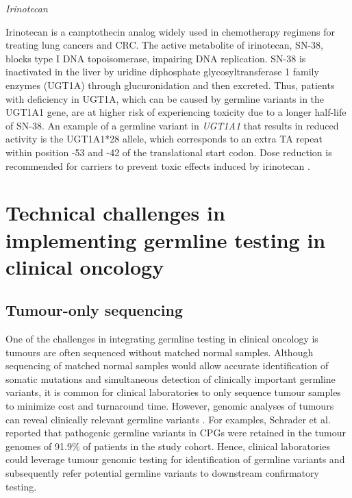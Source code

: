 \newpage
\vspace{5mm}
\noindent\textit{Irinotecan}

Irinotecan is a camptothecin analog widely used in chemotherapy regimens for treating lung cancers and CRC. The active metabolite of irinotecan, SN-38, blocks type I DNA topoisomerase, impairing DNA replication. SN-38 is inactivated in the liver by uridine diphosphate glycosyltransferase 1 family enzymes (\acs{UGT1A}) through glucuronidation and then excreted. Thus, patients with deficiency in UGT1A, which can be caused by germline variants in the \acs{UGT1A1} gene, are at higher risk of experiencing toxicity due to a longer half-life of SN-38. An example of a germline variant in \textit{UGT1A1} that results in reduced activity is the UGT1A1*28 allele, which corresponds to an extra TA repeat within position -53 and -42 of the translational start codon. Dose reduction is recommended for carriers to prevent toxic effects induced by irinotecan \cite{Panczyk2014, Mohelnikova-Duchonova2014}.

\section{Technical challenges in implementing germline testing in clinical oncology}
\label{sec:Challengesinclinicalgermlinetesting}

\subsection{Tumour-only sequencing}

One of the challenges in integrating germline testing in clinical oncology is tumours are often sequenced without matched normal samples. Although sequencing of matched normal samples would allow accurate identification of somatic mutations and simultaneous detection of clinically important germline variants, it is common for clinical laboratories to only sequence tumour samples to minimize cost and turnaround time. However, genomic analyses of tumours can reveal clinically relevant germline variants \cite{Schrader2015, Jones2015a, Meric-Bernstam2016, Bombard2014, WcWhinney2009}. For examples, Schrader et al. \cite{Schrader2015} reported that pathogenic germline variants in CPGs were retained in the tumour genomes of 91.9\% of patients in the study cohort. Hence, clinical laboratories could leverage tumour genomic testing for identification of germline variants and subsequently refer potential germline variants to downstream confirmatory testing.

